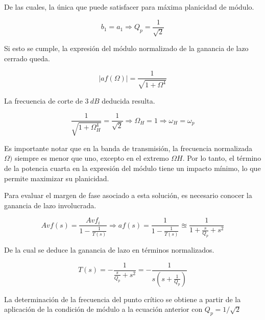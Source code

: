 \bigskip
\hspace{1mm} De las cuales, la única que puede satisfacer para máxima planicidad de módulo.

\begin{equation}
    b_1 = a_1 \Longrightarrow Q_p = \frac{1}{\sqrt{2}}
\end{equation}

\bigskip
\hspace{1mm} Si esto se cumple, la expresión del módulo normalizado de la ganancia de lazo cerrado queda.

\begin{equation}
    |af(\Omega)| = \frac{1}{\sqrt{1 + \Omega ^4}}
\end{equation}

\bigskip
\hspace{1mm} La frecuencia de corte de \(3~dB\) deducida resulta.

\begin{equation}
    \frac{1}{\sqrt{1 + \Omega _H ^4}} = \frac{1}{\sqrt{2}} \Longrightarrow \Omega _H = 1 \Longrightarrow \omega _H = \omega _p
\end{equation}

\bigskip
\hspace{1mm} Es importante notar que en la banda de transmisión, la frecuencia normalizada \( \Omega )\) siempre es menor que uno, excepto en el extremo \( \Omega H \). Por lo tanto, el término de la potencia cuarta en la expresión del módulo tiene un impacto mínimo, lo que permite maximizar su planicidad.

\bigskip
\hspace{1mm} Para evaluar el margen de fase asociado a esta solución, es necesario conocer la ganancia de lazo involucrada.

\begin{equation}
    Avf (s) = \frac{Avf_i}{1 - \frac{1}{T(s)}} \Longrightarrow af(s) = \frac{1}{1 - \frac{1}{T(s)}} \approxeq \frac{1}{1 + \frac{s}{Q_p} + s^2}
\end{equation}

\bigskip
\hspace{1mm} De la cual se deduce la ganancia de lazo en términos normalizados.

\begin{equation}
    T(s) = - \frac{1}{\frac{s}{Q_p} + s^2} = - \frac{1}{s (s + \frac{1}{Q_p})}
\end{equation}

\bigskip
\hspace{1mm} La determinación de la frecuencia del punto crítico se obtiene a partir de la aplicación de la condición de módulo a la ecuación anterior con \( Q_p = 1/\sqrt{2} \)

